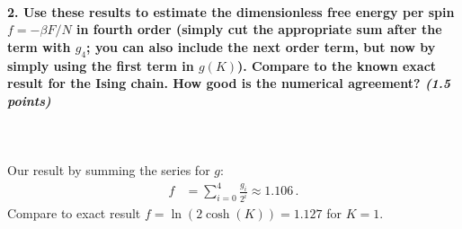 \paragraph{2. Use these results to estimate 
    the dimensionless free energy per spin 
    $f=-\beta F/N$ in fourth order (simply cut 
    the appropriate sum after the term with 
    $g_4$; you can also include the next order
    term, but now by simply using the first 
    term in $g(K)$). Compare to the known 
    exact result for the Ising chain. How good
    is the numerical agreement?
    \textit{(1.5 points)}
}	\ \\
    \\
	Our result by summing the series for $g$:
    \begin{align}
        f
        &=\sum_{i=0}^{4} \frac{g_i}{2^i}
        \approx1.106 \,.
    \end{align}
    Compare to exact result $f=\ln\left(2\cosh(K)\right)=1.127$ for $K=1$.
